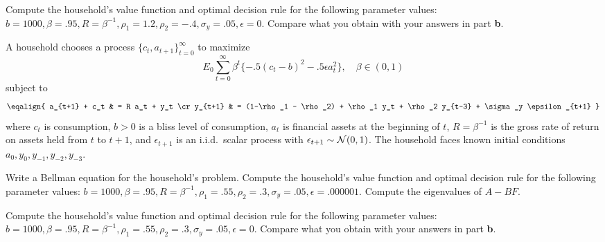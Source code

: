 \medskip
{} Compute the household's value function and optimal decision rule for the following parameter values:
$b=1000, \beta = .95, R = \beta^{-1}, \rho_1 = 1.2, \rho_2 = -.4, \sigma_y = .05, \epsilon=0$.
Compare what you obtain with your answers in part {\bf b}.


\medskip
{} 
\medskip
\noindent
A household chooses a process $\{c_t, a_{t+1}\}_{t=0}^\infty $ to maximize
$$ E_0 \sum_{t=0}^\infty \beta^t \{ -.5 (c_t -b)^2 - .5 \epsilon a_t^2 \}, \quad \beta \in (0,1)  $$
subject to
$$ \eqalign{ a_{t+1} + c_t & = R a_t + y_t \cr
            y_{t+1} & = (1-\rho_1 - \rho_2) + \rho_1  y_t + \rho_2 y_{t-3} + \sigma_y \epsilon_{t+1} }$$
where $c_t$ is consumption, $b >0$ is a bliss level of consumption, $a_t$ is financial assets at the beginning of $t$, $R = \beta^{-1}$ is the gross rate of return
on assets held from $t$ to $t+1$, and $\epsilon_{t+1}$ is an i.i.d.\ scalar process with $\epsilon_{t+1} \sim {\cal N}(0,1)$.
The household faces known initial conditions $a_0, y_0, y_{-1}, y_{-2},  y_{-3}$.

\medskip
{}  Write a Bellman equation for the household's problem.
\medskip
{}  Compute the household's value function and optimal decision rule for the following parameter values:
$b=1000, \beta = .95, R = \beta^{-1}, \rho_1 = .55, \rho_2 = .3, \sigma_y = .05, \epsilon=.000001$.
\medskip
{} Compute the eigenvalues of $A-BF$.

\medskip
{} Compute the household's value function and optimal decision rule for the following parameter values:
$b=1000, \beta = .95, R = \beta^{-1}, \rho_1 = .55, \rho_2 = .3, \sigma_y = .05, \epsilon=0$.
Compare what you obtain with your answers in part {\bf b}.


